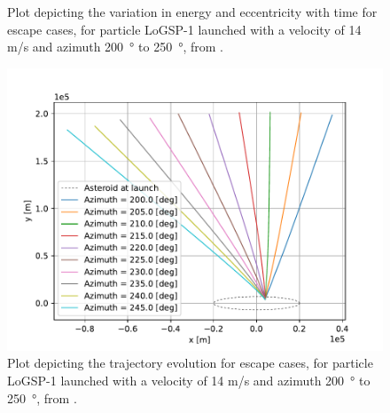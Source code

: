 \documentclass[print]{tudelft-report}
\begin{document}
\begin{appendices}
\begin{figure}[htb]
    \caption{Plot depicting the variation in energy and eccentricity with time for escape cases, for particle LoGSP-1 launched with a velocity of 14 m/s and azimuth \SI{200}{\degree} to \SI{250}{\degree}, from \protect{}.}
    \label{fig:leadingEdge_logsp1_escape_energy_ecc_14ms_200_250_azim_solar225}
    \end{figure}
    \FloatBarrier
    \begin{figure}[htb]
    \centering
    \captionsetup{justification=centering}
    \includegraphics[width=\textwidth, height=0.6\textheight, keepaspectratio=true]{Results/Images/leading_edge_perturbations/logsp1_escape_traj_14ms_200_to_250_azim_solarPhase225.pdf}
    \caption{Plot depicting the trajectory evolution for escape cases, for particle LoGSP-1 launched with a velocity of 14 m/s and azimuth \SI{200}{\degree} to \SI{250}{\degree}, from \protect{}.}
    \label{fig:leadingEdge_logsp1_escape_traj_14ms_200_250_azim_solar225}
    \end{figure}
    \FloatBarrier
    \begin{figure}[htb]
    \centering
    \captionsetup{justification=centering}

\end{figure}
\end{appendices}
\end{document}
